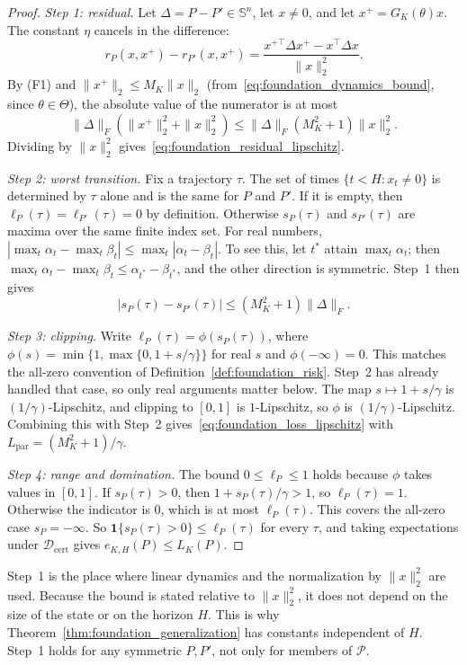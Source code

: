 \begin{proof}
\emph{Step 1: residual.} Let $\Delta=P-P'\in\mathbb S^n$, let $x\ne0$, and
let $x^+=G_K(\theta)x$. The constant $\eta$ cancels in the difference:
\[
 r_P(x,x^+)-r_{P'}(x,x^+)
 =\frac{x^{+\top}\Delta x^+-x^\top\Delta x}{\|x\|_2^2}.
\]
By (F1) and $\|x^+\|_2\le M_K\|x\|_2$
(from~\eqref{eq:foundation_dynamics_bound}, since $\theta\in\Theta$), the
absolute value of the numerator is at most
\[
 \|\Delta\|_F(\|x^+\|_2^2+\|x\|_2^2)\le\|\Delta\|_F(M_K^2+1)\|x\|_2^2 .
\]
Dividing by $\|x\|_2^2$ gives~\eqref{eq:foundation_residual_lipschitz}.

\emph{Step 2: worst transition.} Fix a trajectory $\tau$. The set of times
$\{t<H:x_t\ne0\}$ is determined by $\tau$ alone and is the same for $P$ and
$P'$. If it is empty, then $\ell_P(\tau)=\ell_{P'}(\tau)=0$ by definition.
Otherwise $s_P(\tau)$ and $s_{P'}(\tau)$ are maxima over the same finite
index set. For real numbers, $|\max_t\alpha_t-\max_t\beta_t|\le
\max_t|\alpha_t-\beta_t|$. To see this, let $t^*$ attain $\max_t\alpha_t$;
then $\max_t\alpha_t-\max_t\beta_t\le\alpha_{t^*}-\beta_{t^*}$, and the other
direction is symmetric. Step~1 then gives
\[
 |s_P(\tau)-s_{P'}(\tau)|\le(M_K^2+1)\|\Delta\|_F .
\]

\emph{Step 3: clipping.} Write $\ell_P(\tau)=\phi(s_P(\tau))$, where
$\phi(s)=\min\{1,\max\{0,1+s/\gamma\}\}$ for real $s$ and
$\phi(-\infty)=0$. This matches the all-zero convention of
Definition~\ref{def:foundation_risk}. Step~2 has already handled that
case, so only real arguments matter below. The map $s\mapsto1+s/\gamma$ is
$(1/\gamma)$-Lipschitz, and clipping to $[0,1]$ is $1$-Lipschitz, so $\phi$
is $(1/\gamma)$-Lipschitz. Combining this with Step~2
gives~\eqref{eq:foundation_loss_lipschitz} with
$L_{\mathrm{par}}=(M_K^2+1)/\gamma$.

\emph{Step 4: range and domination.} The bound $0\le\ell_P\le1$ holds
because $\phi$ takes values in $[0,1]$. If $s_P(\tau)>0$, then
$1+s_P(\tau)/\gamma>1$, so $\ell_P(\tau)=1$. Otherwise the indicator is $0$,
which is at most $\ell_P(\tau)$. This covers the all-zero case
$s_P=-\infty$. So $\mathbf 1\{s_P(\tau)>0\}\le\ell_P(\tau)$ for every
$\tau$, and taking expectations under $\mathcal D_{\mathrm{cert}}$ gives
$e_{K,H}(P)\le L_K(P)$.
\end{proof}

Step~1 is the place where linear dynamics and the normalization by
$\|x\|_2^2$ are used. Because the bound is stated relative to $\|x\|_2^2$,
it does not depend on the size of the state or on the horizon $H$. This is
why Theorem~\ref{thm:foundation_generalization} has constants independent
of $H$. Step~1 holds for any symmetric $P,P'$, not only for members of
$\mathcal P$.

